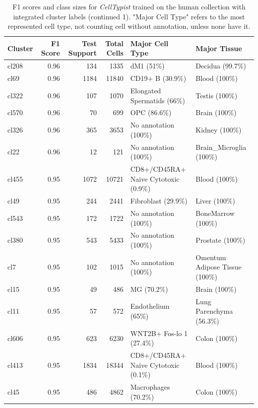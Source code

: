 \begin{table}[ht!]
\scriptsize
\caption[F1 scores and class sizes for \textit{CellTypist} trained on the human collection with integrated cluster labels (continued 1)]{F1 scores and class sizes for \textit{CellTypist} trained on the human collection with integrated cluster labels (continued 1). "Major Cell Type" refers to the most represented cell type, not counting cell without annotation, unless none have it.}
\centering
\label{table:tab_HAmodelclust1}
\begin{tabular}{lrrrll}
  \toprule
Cluster & F1 Score & Test Support & Total Cells & Major Cell Type & Major Tissue \\ 
  \midrule  
  cl208 & 0.96 & 134 & 1335 & dM1 (51\%) & Decidua (99.7\%) \\ 
  cl69 & 0.96 & 1184 & 11840 & CD19+ B (30.9\%) & Blood (100\%) \\ 
  cl322 & 0.96 & 107 & 1070 & Elongated Spermatids (66\%) & Testis (100\%) \\ 
  cl570 & 0.96 &  70 & 699 & OPC (86.6\%) & Brain (100\%) \\ 
  cl326 & 0.96 & 365 & 3653 & No annotation (100\%) & Kidney (100\%) \\ 
  cl22 & 0.96 &  12 & 121 & No annotation (100\%) & Brain\_Microglia (100\%) \\ 
  cl455 & 0.95 & 1072 & 10721 & \specialcell[t]{CD8+/CD45RA+\\Naive Cytotoxic (0.9\%)} & Blood (100\%) \\ 
  cl49 & 0.95 & 244 & 2441 & Fibroblast (29.9\%) & Liver (100\%) \\ 
  cl543 & 0.95 & 172 & 1722 & No annotation (100\%) & BoneMarrow (100\%) \\ 
  cl380 & 0.95 & 543 & 5433 & No annotation (100\%) & Prostate (100\%) \\ 
  cl7 & 0.95 & 102 & 1015 & No annotation (100\%) & Omentum Adipose Tissue (100\%) \\ 
  cl15 & 0.95 &  49 & 486 & MG (70.2\%) & Brain (100\%) \\ 
  cl11 & 0.95 &  57 & 572 & Endothelium (65\%) & Lung Parenchyma (56.3\%) \\ 
  cl606 & 0.95 & 623 & 6230 & WNT2B+ Fos-lo 1 (27.4\%) & Colon (100\%) \\ 
  cl413 & 0.95 & 1834 & 18344 & \specialcell[t]{CD8+/CD45RA+\\Naive Cytotoxic (0.1\%)} & Blood (100\%) \\ 
  cl45 & 0.95 & 486 & 4862 & Macrophages (70.2\%) & Colon (100\%) \\ 

\end{tabular}
\end{table}

